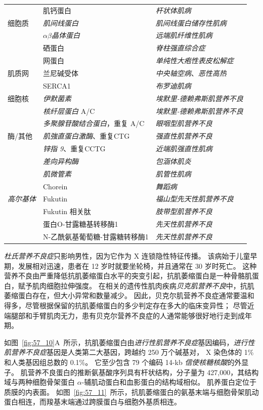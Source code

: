 \begin{table}[htbp]
\begin{tabular}{lll}
		 & 肌钙蛋白 & \textit{杆状体肌病} \\
		细胞质 & \textit{肌间线蛋白} & \textit{肌间线蛋白储存性肌病} \\
		 & $\alpha \beta$\textit{晶体蛋白} & \textit{远端肌纤维性肌病} \\
		 & 硒蛋白 & \textit{脊柱强直综合症} \\
		 & 网蛋白 & \textit{单纯性大疱性表皮松解症} \\
		肌质网 & 兰尼碱受体 & \textit{中央轴空病}、\textit{恶性高热} \\
		 & SERCA1 & \textit{布罗迪肌病} \\
		细胞核 & \textit{伊默菌素} & \textit{埃默里-德赖弗斯肌营养不良} \\
		 & \textit{核纤层蛋白} A/C & \textit{埃默里-德赖弗斯肌营养不良} \\
		 & \textit{多聚腺苷酸结合蛋白}，重复 A/C & \textit{眼咽型肌营养不良} \\
		酶/其他 & \textit{肌強直蛋白激酶}、重复CTG & \textit{强直性肌营养不良} \\
		 & \textit{锌指 9}、重复CCTG & \textit{近端肌强直性肌病} \\
		 & \textit{差向异构酶} & \textit{包涵体肌炎} \\
		 & \textit{肌微管素} & \textit{肌管性肌病} \\
		 & Chorein & \textit{舞蹈病} \\
		\textit{高尔基体} & Fukutin & \textit{福山型先天性肌营养不良} \\
		 & Fukutin 相关肽 & \textit{肢带型肌营养不良} \\
		 & 蛋白O-甘露糖基转移酶1 & \textit{先天性肌营养不良} \\
		 & N-乙酰氨基葡萄糖-甘露糖转移酶1 & \textit{先天性肌营养不良} \\
		\bottomrule
	\end{tabular}
\end{table}


\textit{杜氏营养不良症}只影响男性，因为它作为 X 连锁隐性特征传播。
该病始于儿童早期，发展相对迅速，患者在 12 岁时就要坐轮椅，并且通常在 30 岁时死亡。
这种营养不良由严重降低抗肌萎缩蛋白水平的突变引起，抗肌萎缩蛋白是一种骨骼肌蛋白，赋予肌肉细胞拉伸强度。
在相关的遗传性肌肉疾病\textit{贝克肌营养不良}中，抗肌萎缩蛋白存在，但大小异常和数量减少。
因此，贝克尔肌营养不良症通常要温和得多，尽管根据保留的抗肌萎缩蛋白的多少判定存在多大的临床变异性；
尽管近端腿部和手臂肌肉无力，患有贝克尔营养不良症的人通常能够很好地行走到成年期。


如图~\ref{fig:57_10}A~所示，抗肌萎缩蛋白由\textit{进行性肌营养不良症}基因编码，\textit{进行性肌营养不良症}基因是人类第二大基因，跨越约 250 万个碱基对， X 染色体的 1\% 和人类基因组总数的 0.1\%。
它至少包含 79 个编码 14-kb \textit{信使核糖核酸}的外显子。
肌营养不良蛋白的推断氨基酸序列具有杆状结构，分子量为 427,000，其结构域与两种细胞骨架蛋白 $ \alpha $-辅肌动蛋白和血影蛋白的结构域相似。
肌养蛋白定位于质膜的内表面。
如图~\ref{fig:57_11}~所示，抗肌萎缩蛋白的氨基末端与细胞骨架肌动蛋白相连，而羧基末端通过跨膜蛋白与细胞外基质相连。


